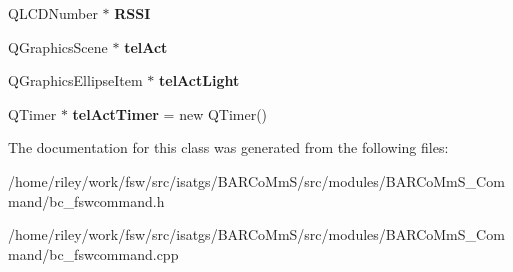 \begin{DoxyCompactItemize}
\item 
Q\+L\+C\+D\+Number $\ast$ {\bfseries R\+S\+SI}\hypertarget{class_b_c___f_s_w_command_a47653239d9de4d5e3a4873a819724210}{}\label{class_b_c___f_s_w_command_a47653239d9de4d5e3a4873a819724210}

\item 
Q\+Graphics\+Scene $\ast$ {\bfseries tel\+Act}\hypertarget{class_b_c___f_s_w_command_ac325d45d18052b6dabc15ac04844cea0}{}\label{class_b_c___f_s_w_command_ac325d45d18052b6dabc15ac04844cea0}

\item 
Q\+Graphics\+Ellipse\+Item $\ast$ {\bfseries tel\+Act\+Light}\hypertarget{class_b_c___f_s_w_command_a9770d402fb9105744836fbfd2bfa458a}{}\label{class_b_c___f_s_w_command_a9770d402fb9105744836fbfd2bfa458a}

\item 
Q\+Timer $\ast$ {\bfseries tel\+Act\+Timer} = new Q\+Timer()\hypertarget{class_b_c___f_s_w_command_ad4ae190549649ef2d1bb8e2e216c3408}{}\label{class_b_c___f_s_w_command_ad4ae190549649ef2d1bb8e2e216c3408}

\end{DoxyCompactItemize}


The documentation for this class was generated from the following files\+:\begin{DoxyCompactItemize}
\item 
/home/riley/work/fsw/src/isatgs/\+B\+A\+R\+Co\+Mm\+S/src/modules/\+B\+A\+R\+Co\+Mm\+S\+\_\+\+Command/bc\+\_\+fswcommand.\+h\item 
/home/riley/work/fsw/src/isatgs/\+B\+A\+R\+Co\+Mm\+S/src/modules/\+B\+A\+R\+Co\+Mm\+S\+\_\+\+Command/bc\+\_\+fswcommand.\+cpp\end{DoxyCompactItemize}
